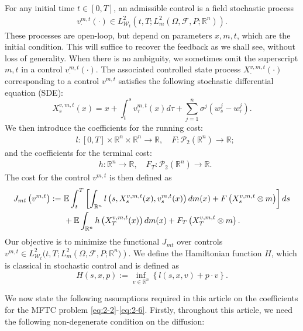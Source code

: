 \documentclass[11pt]{article}
\numberwithin{equation}{section}
\newcommand{\e}{\mathbb{E}}
\newcommand{\br}{\mathbb{R}}
\newcommand{\pr}{\mathcal{P}}
\newcommand{\brn}{{\mathbb{R}^n}}
\newcommand{\1}{\mbox{1\hspace{-1mm}I}}
\begin{document}
For any initial time $t\in[0,T]$, an admissible control is a field stochastic process 
\begin{align*}
    v^{m,t}_\cdot(\cdot) \in L_{\mathcal{W}_{t}}^{2}\left(t,T;L_{m}^{2}(\Omega,\mathcal{F},P;\brn)\right).
\end{align*}
These processes are open-loop, but depend on parameters $x,m,t$, which are the initial condition. This will suffice to recover the feedback as we shall see, without loss of generality. When there is no ambiguity, we sometimes omit the superscript $m,t$ in a control $v^{m,t}_\cdot(\cdot)$. The associated controlled state process $X^{v,m,t}_\cdot(\cdot)$ corresponding to a control $v^{m,t}$ satisfies the following stochastic differential equation (SDE): 
\begin{equation}\label{eq:2-2}
    X^{v,m,t}_s(x)=x+\int_t^s v^{m,t}_\tau (x)d\tau + \sum_{j=1}^{n}\sigma^{j} \left(w^{j}_s-w^{j}_\tau\right).
\end{equation}
We then introduce the coefficients for the running cost:
\begin{align*}
    &l:[0,T]\times\brn\times \brn \to \br,\quad F:\pr_2(\brn)\to\br;
\end{align*}
and the coefficients for the terminal cost:
\begin{align*}
    &h: \brn\to\br,\quad F_T: \pr_2(\brn)\to\br.
\end{align*}
The cost for the control $v^{m,t}$ is then defined as
\begin{align}
    J_{mt}\left(v^{m,t}\right):=\ & \e\int_{t}^{T}\left[\int_{\brn} l\left(s,X^{v,m,t}_s(x),v^{m,t}_s(x)\right)dm(x)+F\left(X^{v,m,t}_s\otimes m\right) \right]ds \notag \\
    & +\e \int_{\brn} h \left(X^{v,m,t}_T(x)\right) dm(x)+F_{T}\left(X^{v,m,t}_T\otimes m\right). \label{eq:2-6}
\end{align}
Our objective is to minimize the functional $J_{mt}$ over controls $v^{m,t} \in L_{\mathcal{W}_{t}}^{2}(t,T;L_{m}^{2}\left(\Omega,\mathcal{F},P;\brn)\right)$. We define the Hamiltonian function $H$, which is classical in stochastic control and is defined as
\begin{equation*}
    H(s,x,p):=\inf_{v\in\brn}\left\{l(s,x,v)+p\cdot v\right\}.
\end{equation*}

We now state the following assumptions required in this article on the coefficients for the MFTC problem \eqref{eq:2-2}-\eqref{eq:2-6}. Firstly, throughout this article, we need the following non-degenerate condition on the diffusion:
\end{document}
